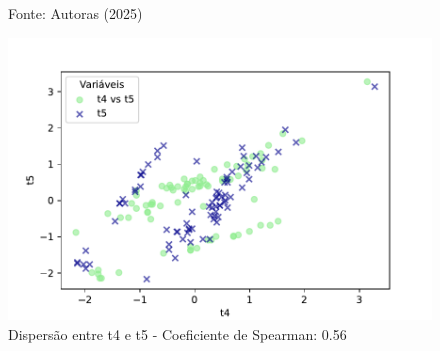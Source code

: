 \begin{figure}[h]
\begin{minipage}[b]{0.45\linewidth}
        \vspace{0.3cm}
        \begin{minipage}{\linewidth}
            \centering
            \scriptsize{Fonte: Autoras (2025)}
        \end{minipage}
    \end{minipage}
\end{figure}
\FloatBarrier

\begin{figure}[h]
    \captionsetup{font=footnotesize, justification=centering, labelsep=period, position=above}
    \centering
    \begin{minipage}[b]{0.45\linewidth}
        \caption{Dispersão entre t4 e t5 - Coeficiente de Spearman: 0.56}
        \label{fig:t4-t5}
        \centering
        \includegraphics[scale=0.48]{figuras/Spearman/t4-t5.pdf}
        \vspace{0.3cm}
        \begin{minipage}{\linewidth}
            \centering
        \end{minipage}
    \end{minipage}
    \hspace{0.05\linewidth}
    \begin{minipage}[b]{0.45\linewidth}

\end{minipage}
\end{figure}
